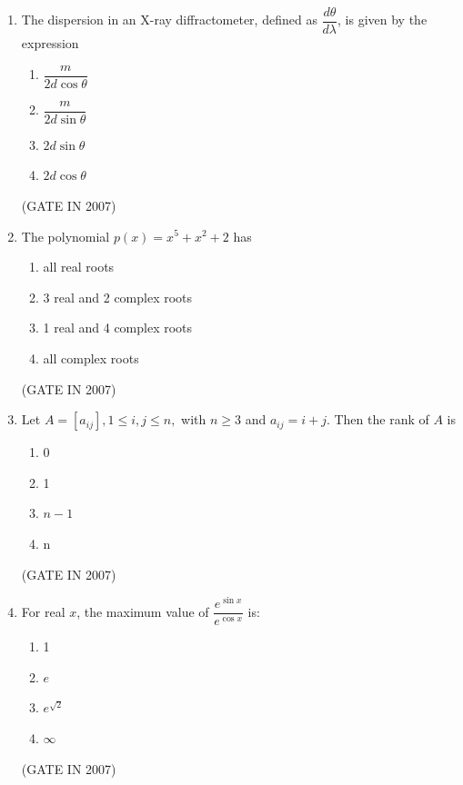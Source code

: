 \documentclass[journal]{IEEEtran}
\begin{document}
\begin{enumerate}
\item The dispersion in an X-ray diffractometer, defined as $\dfrac{d\theta}{d\lambda}$, is given by the expression  
\begin{multicols}{4}
\begin{enumerate}
\item $\dfrac{m}{2d \cos \theta}$  
\item $\dfrac{m}{2d \sin \theta}$  
\item $2d \sin \theta$  
\item $2d \cos \theta$  
\end{enumerate}
\end{multicols}
\hfill(GATE IN 2007)

\item The polynomial $p(x) = x^5 + x^2 + 2$ has  
\begin{multicols}{2}
\begin{enumerate}
\item all real roots  
\item 3 real and 2 complex roots  
\item 1 real and 4 complex roots  
\item all complex roots  
\end{enumerate}
\end{multicols}

\hfill(GATE IN 2007)
\item Let $A = [a_{ij}], 1 \leq i,j \leq n,$ with $n \geq 3$ and $a_{ij} = i+j$. Then the rank of $A$ is  
	\begin{multicols}{4}
\begin{enumerate}
\item 0  
\item 1  
\item $n-1$  
\item n  
\end{enumerate}
\end{multicols}
\hfill(GATE IN 2007)

\item For real $ x $, the maximum value of $ \dfrac{e^{\sin x}}{e^{\cos x}} $ is:
\begin{multicols}{2}
\begin{enumerate}
\item 1
\item $ e $
\item $ e^{\sqrt{2}} $
\item $ \infty $
\end{enumerate}
\end{multicols}
\hfill(GATE IN 2007)


\end{enumerate}
\end{document}
